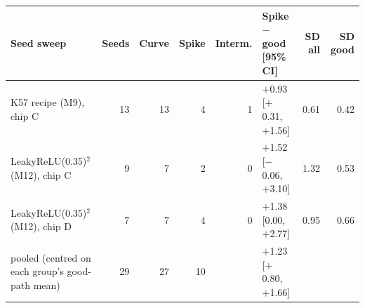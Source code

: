 {\footnotesize\setlength{\tabcolsep}{4pt}
\begin{tabular}{@{}p{4.0cm}rrrrlrr@{}}
\toprule
Seed sweep & Seeds & Curve & Spike & Interm. & Spike $-$ good [95\% CI] & SD all & SD good \\
\midrule
K57 recipe (M9), chip C & 13 & 13 & 4 & 1 & \ensuremath{+}0.93 [\ensuremath{+}0.31, \ensuremath{+}1.56] & 0.61 & 0.42 \\
LeakyReLU(0.35)$^2$ (M12), chip C & 9 & 7 & 2 & 0 & \ensuremath{+}1.52 [\ensuremath{-}0.06, \ensuremath{+}3.10] & 1.32 & 0.53 \\
LeakyReLU(0.35)$^2$ (M12), chip D & 7 & 7 & 4 & 0 & \ensuremath{+}1.38 [0.00, \ensuremath{+}2.77] & 0.95 & 0.66 \\
\midrule
pooled (centred on each group's good-path mean) & 29 & 27 & 10 & & \ensuremath{+}1.23 [\ensuremath{+}0.80, \ensuremath{+}1.66] & & \\
\bottomrule
\end{tabular}
}
